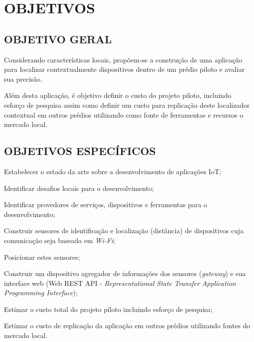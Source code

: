
\chapter{OBJETIVOS}
\label{chap:OBJETIVOS}

\section{OBJETIVO GERAL}
\label{sec:OBJETIVO GERAL}

Considerando características locais, propõem-se a construção de uma aplicação
para localizar contextualmente dispositivos dentro de um prédio piloto e avaliar
sua precisão.

Além desta aplicação, é objetivo definir o custo do projeto piloto, incluindo
esforço de pesquisa assim como definir um custo para replicação deste
localizador contextual em outros prédios utilizando como fonte de ferramentas e
recursos o mercado local.

\section{OBJETIVOS ESPECÍFICOS}
\label{sec:OBJETIVOS ESPECÍFICOS}

\begin{alineas}

	\item Estabelecer o estado da arte sobre a desenvolvimento de aplicações IoT;

	\item Identificar desafios locais para o desenvolvimento;

	\item Identificar provedores de serviços, dispositivos e ferramentas para o
desenvolvimento;

	\item Construir sensores de identificação e localização (distância) de
 dispositivos cuja comunicação seja baseada em \textit{Wi-Fi};

	\item Posicionar estes sensores;

	\item Construir um dispositivo agregador de informações dos sensores
 (\textit{gateway}) e sua interface web (Web REST API - \textit{Representational
State Transfer} \textit{Application Programming Interface});

	\item Estimar o custo total do projeto piloto incluindo esforço de pesquisa;

	\item Estimar o custo de replicação da aplicação em outros prédios
	utilizando fontes do mercado local.

\end{alineas}
